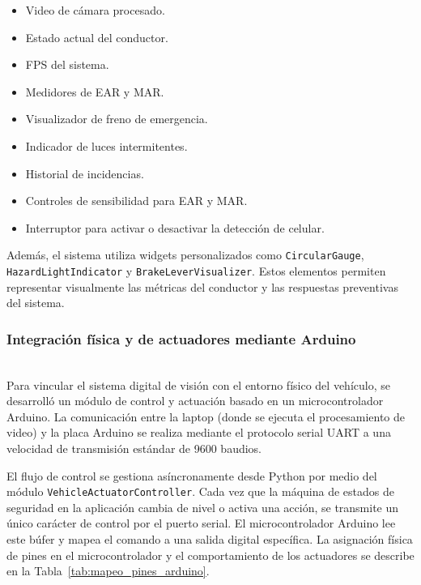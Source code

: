 \documentclass[conference]{IEEEtran}
\begin{document}
\begin{itemize}
    \item Video de cámara procesado.
    
    \item Estado actual del conductor.
    
    \item FPS del sistema.
    
    \item Medidores de EAR y MAR.
    
    \item Visualizador de freno de emergencia.
    
    \item Indicador de luces intermitentes.
    
    \item Historial de incidencias.
    
    \item Controles de sensibilidad para EAR y MAR.
    
    \item Interruptor para activar o desactivar la detección de celular.
\end{itemize}

Además, el sistema utiliza widgets personalizados como \texttt{CircularGauge}, \texttt{HazardLightIndicator} y \texttt{BrakeLeverVisualizer}. Estos elementos permiten representar visualmente las métricas del conductor y las respuestas preventivas del sistema.\\

\subsubsection{Integración física y de actuadores mediante Arduino}\mbox{}\\

Para vincular el sistema digital de visión con el entorno físico del vehículo, se desarrolló un módulo de control y actuación basado en un microcontrolador Arduino. La comunicación entre la laptop (donde se ejecuta el procesamiento de video) y la placa Arduino se realiza mediante el protocolo serial UART a una velocidad de transmisión estándar de 9600 baudios. 

El flujo de control se gestiona asíncronamente desde Python por medio del módulo \texttt{VehicleActuatorController}. Cada vez que la máquina de estados de seguridad en la aplicación cambia de nivel o activa una acción, se transmite un único carácter de control por el puerto serial. El microcontrolador Arduino lee este búfer y mapea el comando a una salida digital específica. La asignación física de pines en el microcontrolador y el comportamiento de los actuadores se describe en la Tabla~\ref{tab:mapeo_pines_arduino}.
\end{document}
